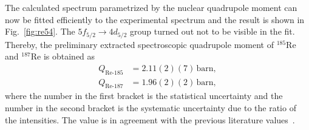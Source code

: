 The calculated spectrum parametrized by the nuclear quadrupole moment can now be fitted efficiently to the experimental spectrum and the result is shown in Fig.~\ref{fig:re54}. The $5f_{5/2}\rightarrow 4d_{5/2}$ group turned out not to be visible in the fit. Thereby, the preliminary extracted spectroscopic quadrupole moment of $^{185}$Re and $^{187}$Re is obtained as
\begin{align}
Q_{\text{Re-}185} &= 2.11(2)(7)\,\text{barn},\\
Q_{\text{Re-}187} &= 1.96(2)(2)\,\text{barn},
\end{align}
where the number in the first bracket is the statistical uncertainty and the number in the second bracket is the systematic uncertainty due to the ratio of the intensities. The value is in agreement with the previous literature values~\cite{Stone2005}.%

